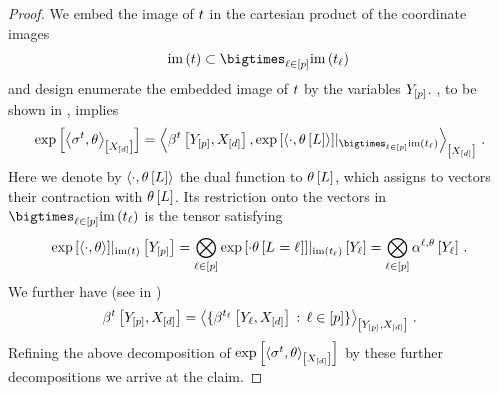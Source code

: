 \begin{proof}
    We embed the image of $t$ in the cartesian product of the coordinate images  %
    \begin{align*}
        \imageof{\sstat} \subset \bigtimes_{\selindexin} \imageof{\sstatcoordinateof{\selindex}} \,
    \end{align*}
    and design enumerate the embedded image of $t$ by the variables $Y_{[p]}$.
    , to be shown in , implies
    \begin{align*}
        \expof{\contractionof{\sencsstat,\canparam}{\shortcatvariables}}
        = \contractionof{
            \bencodingofat{\sstat}{\headvariables,\shortcatvariables},\restrictionofto{\expof{\braket{\cdot,\canparamwith}}
            }{\bigtimes_{\selindexin}\imageof{\sstatcoordinateof{\selindex}}}}{\shortcatvariables} \, .
    \end{align*}
    Here we denote by $\braket{\cdot,\theta\left[L\right]}$ the dual function to $\theta\left[L\right]$, which assigns to vectors their contraction with $\theta\left[L\right]$.
    Its restriction onto the vectors in $\bigtimes_{\selindexin}\imageof{\sstatcoordinateof{\selindex}}$ is the tensor satisfying
    \begin{align*}
        {\mathrm{exp}\left[\braket{\cdot,\theta}\right]}|_{\mathrm{im}\left(t\right)}\left[Y_{[p]}\right]
        = \bigotimes_{\ell\in[p]} {\mathrm{exp}\left[\cdot \theta\left[L_{}=\ell_{}\right]\right]}|_{\mathrm{im}\left(t_{\ell}\right)}\left[Y_{\ell}\right]
        = \bigotimes_{\ell\in[p]} \alpha^{\ell,\theta}\left[Y_{\ell}\right] \, .
    \end{align*}
    We further have (see  in )
    \begin{align*}
        \bencodingofat{\sstat}{\headvariables,\shortcatvariables}
        = \contractionof{\{\bencodingofat{\sstatcoordinateof{\selindex}}{\headvariableof{\selindex},\shortcatvariables} \wcols\selindexin\}}{\headvariables,\shortcatvariables} \, .
    \end{align*}
    Refining the above decomposition of $\mathrm{exp}\left[\left\langle \sigma^{t},\theta\right\rangle_{\left[ X_{[d]} \right]}\right]$ by these further decompositions we arrive at the claim.
\end{proof}


